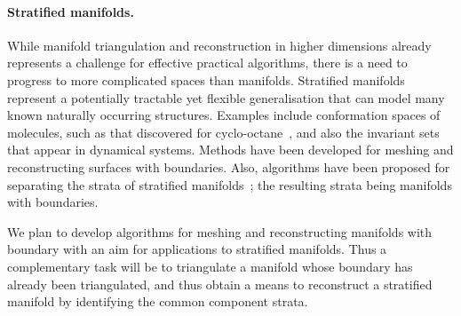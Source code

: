 \paragraph{Stratified manifolds.}

While manifold triangulation and reconstruction in higher dimensions
already represents a challenge for effective practical algorithms,
there is a need to progress to more complicated spaces than
manifolds. Stratified manifolds represent a potentially tractable yet
flexible generalisation that can model many known naturally occurring
structures. Examples include conformation spaces of molecules, such as
that discovered for cyclo-octane~\cite{mtcw-tco-2010}, and also the invariant sets that
appear in dynamical systems.
%
Methods have been developed for meshing and reconstructing surfaces
with boundaries. Also, algorithms have been proposed for separating
the strata of stratified manifolds~\cite{bendich2007}; the resulting
strata being manifolds with boundaries. 

We plan to develop algorithms for meshing and reconstructing manifolds
with boundary with an aim for applications to stratified
manifolds. Thus a complementary task will be to triangulate a manifold
whose boundary has already been triangulated, and thus obtain a means
to reconstruct a stratified manifold by identifying the common
component strata. 
